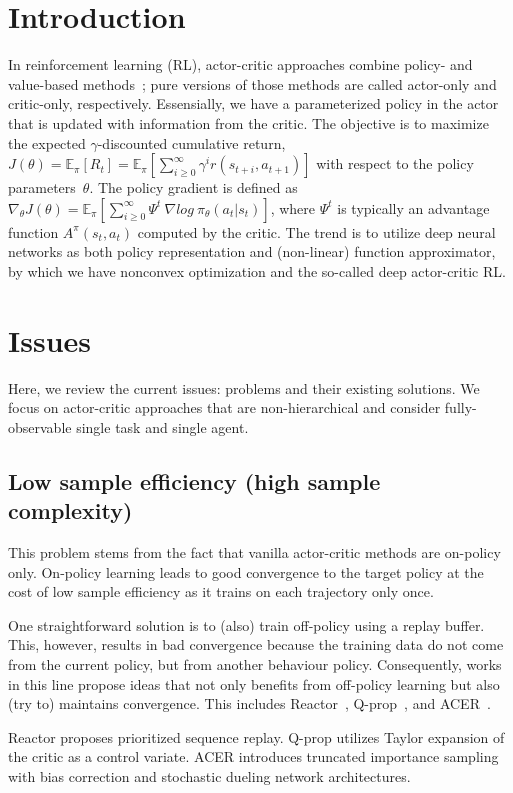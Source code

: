 \section{Introduction}
In reinforcement learning (RL),
actor-critic approaches combine policy- and value-based methods~\cite{6392457};
pure versions of those methods are called actor-only and critic-only, respectively.
Essensially, we have a parameterized policy in the actor that is
updated with information from the critic.
The objective is to maximize the expected $\gamma$-discounted cumulative return,
$J(\theta) = \mathbb{E}_{\pi} [R_t] = \mathbb{E}_{\pi} [ \sum_{i \ge 0}^{\infty} \gamma^i r(s_{t+i}, a_{t+1}) ]$
with respect to the policy parameters~$\theta$.
The policy gradient is defined as
$\nabla_{\theta} J(\theta) = \mathbb{E}_{\pi} [ \sum_{i \ge 0}^{\infty} \Psi^t~\nabla log~\pi_{\theta} (a_t | s_t) ]$,
where $\Psi^t$ is typically an advantage function $A^{\pi}(s_t,a_t)$ computed by the critic.
The trend is to utilize deep neural networks as both policy representation and
(non-linear) function approximator, by which we have nonconvex optimization and
the so-called deep actor-critic RL.

\section{Issues}
Here, we review the current issues: problems and their existing solutions.
We focus on actor-critic approaches that are non-hierarchical and
consider fully-observable single task and single agent.

\subsection{Low sample efficiency (high sample complexity)}
This problem stems from the fact that vanilla actor-critic methods are on-policy only.
On-policy learning leads to good convergence to the target policy at
the cost of low sample efficiency as it trains on each trajectory only once.

One straightforward solution is to (also) train off-policy using a replay buffer.
This, however, results in bad convergence because the training data
do not come from the current policy, but from another behaviour policy.
Consequently, works in this line propose ideas that not only benefits from off-policy learning
but also (try to) maintains convergence.
This includes Reactor~\cite{Gruslys2018}, Q-prop~\cite{}, and ACER~\cite{}.

Reactor proposes prioritized sequence replay.
Q-prop utilizes Taylor expansion of the critic as a control variate.
ACER introduces truncated importance sampling with bias correction and
stochastic dueling network architectures.

